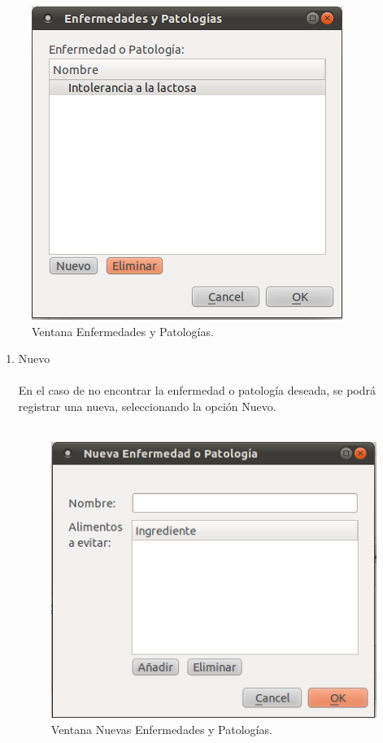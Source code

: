\begin{enumerate}
\begin{enumerate}
\begin{enumerate}
\begin{figure}[H]
\begin{center}
    \includegraphics[scale=0.5]{../../Image/enfermedad.png}
  \end{center}
  \caption{Ventana Enfermedades y Patologías.}
\end{figure}

\begin{enumerate}
\item Nuevo\\\\
En el caso de no encontrar la enfermedad o patología deseada, se podrá registrar una nueva, seleccionando la opción Nuevo.\\\\
\begin{figure}[H]
  \label{enfermedad_nueva}
  \begin{center}
    \includegraphics[scale=0.5]{../../Image/enfermedad-nueva.png}
  \end{center}
  \caption{Ventana Nuevas Enfermedades y Patologías.}
\end{figure}


\end{enumerate}
\end{enumerate}
\end{enumerate}
\end{enumerate}
